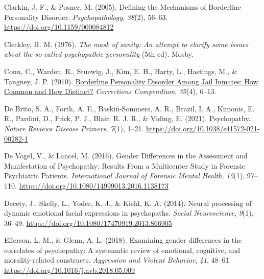 \documentclass[
  man,floatsintext]{apa7}
\newlength{\cslhangindent}
\newlength{\cslentryspacingunit} %
\newenvironment{CSLReferences}[2] %
 {%
  \setlength{\parindent}{0pt}
  \ifodd #1
  \let\oldpar\par
  \def\par{\hangindent=\cslhangindent\oldpar}
  \fi
  \setlength{\parskip}{#2\cslentryspacingunit}
 }%
 {}
\begin{document}
\begin{CSLReferences}{1}{0}
\leavevmode{}%
Clarkin, J. F., \& Posner, M. (2005). Defining the {Mechanisms} of {Borderline Personality Disorder}. \emph{Psychopathology}, \emph{38}(2), 56--63. \url{https://doi.org/10.1159/000084812}

\leavevmode{}%
Cleckley, H. M. (1976). \emph{The mask of sanity: An attempt to clarify some issues about the so-called psychopathic personality} (5th ed). {Mosby}.

\leavevmode{}%
Conn, C., Warden, R., Stuewig, J., Kim, E. H., Harty, L., Hastings, M., \& Tangney, J. P. (2010). \href{https://www.ncbi.nlm.nih.gov/pmc/articles/PMC4825675}{Borderline {Personality Disorder Among Jail Inmates}: {How Common} and {How Distinct}?} \emph{Corrections Compendium}, \emph{35}(4), 6--13.

\leavevmode{}%
De Brito, S. A., Forth, A. E., Baskin-Sommers, A. R., Brazil, I. A., Kimonis, E. R., Pardini, D., Frick, P. J., Blair, R. J. R., \& Viding, E. (2021). Psychopathy. \emph{Nature Reviews Disease Primers}, \emph{7}(1), 1--21. \url{https://doi.org/10.1038/s41572-021-00282-1}

\leavevmode{}%
De Vogel, V., \& Lancel, M. (2016). Gender {Differences} in the {Assessment} and {Manifestation} of {Psychopathy}: {Results From} a {Multicenter Study} in {Forensic Psychiatric Patients}. \emph{International Journal of Forensic Mental Health}, \emph{15}(1), 97--110. \url{https://doi.org/10.1080/14999013.2016.1138173}

\leavevmode{}%
Decety, J., Skelly, L., Yoder, K. J., \& Kiehl, K. A. (2014). Neural processing of dynamic emotional facial expressions in psychopaths. \emph{Social Neuroscience}, \emph{9}(1), 36--49. \url{https://doi.org/10.1080/17470919.2013.866905}

\leavevmode{}%
Efferson, L. M., \& Glenn, A. L. (2018). Examining gender differences in the correlates of psychopathy: {A} systematic review of emotional, cognitive, and morality-related constructs. \emph{Aggression and Violent Behavior}, \emph{41}, 48--61. \url{https://doi.org/10.1016/j.avb.2018.05.009}


\end{CSLReferences}
\end{document}
